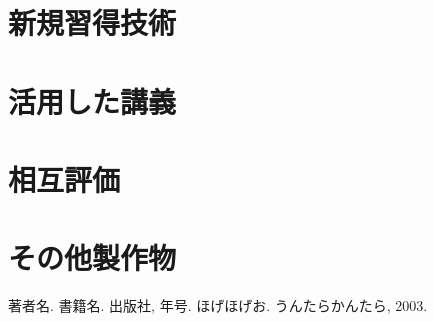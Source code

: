 \documentclass[openany,11pt,papersize]{jsbook}
\begin{document}

\begin{appendix}

\chapter{新規習得技術}


\chapter{活用した講義}

\chapter{相互評価}

\chapter{その他製作物}

\end{appendix}



\begin{thebibliography}{9}
  著者名. 書籍名. 出版社,  年号.
  ほげほげお. うんたらかんたら,  2003.
\end{thebibliography}
\end{document}
